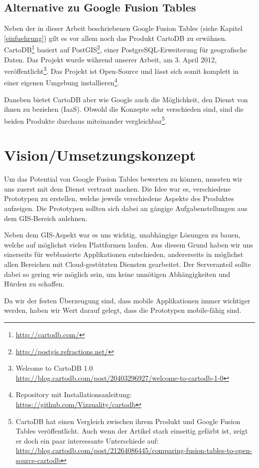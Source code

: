 \subsection{Alternative zu Google Fusion Tables}
Neben der in dieser Arbeit beschriebenen Google Fusion Tables (siehe Kapitel \ref{einfuehrung}) gilt es vor allem noch das Produkt CartoDB zu erwähnen. CartoDB\footnote{\url{http://cartodb.com/}} basiert auf PostGIS\footnote{\url{http://postgis.refractions.net/}}, einer PostgreSQL-Erweiterung für geografische Daten. Das Projekt wurde während unserer Arbeit, am 3. April 2012, veröffentlicht\footnote{Welcome to CartoDB 1.0 \url{http://blog.cartodb.com/post/20403296927/welcome-to-cartodb-1-0}}. Das Projekt ist Open-Source und lässt sich somit komplett in einer eigenen Umgebung installieren\footnote{Repository mit Installationsanleitung: \url{https://github.com/Vizzuality/cartodb}}.

Daneben bietet CartoDB aber wie Google auch die Möglichkeit, den Dienst von ihnen zu beziehen (\gls{IaaS}). Obwohl  die Konzepte sehr verschieden sind, sind die beiden Produkte durchaus miteinander vergleichbar\footnote{CartoDB hat einen Vergleich zwischen ihrem Produkt und Google Fusion Tables veröffentlicht. Auch wenn der Artikel stark einseitig gefärbt ist, zeigt er doch ein paar interessante Unterschiede auf: \url{http://blog.cartodb.com/post/21264086445/comparing-fusion-tables-to-open-source-cartodb}}.

\section{Vision/Umsetzungskonzept}
Um das Potential von Google Fusion Tables bewerten zu können, mussten wir uns zuerst mit dem Dienst vertraut machen. Die Idee war es, verschiedene Prototypen zu erstellen, welche jeweils verschiedene Aspekte des Produktes aufzeigen. Die Prototypen sollten sich dabei an gängige Aufgabenstellungen aus dem \gls{GIS}-Bereich anlehnen.

Neben dem \gls{GIS}-Aspekt war es uns wichtig, unabhängige Lösungen zu bauen, welche auf möglichst vielen Plattformen laufen. Aus diesem Grund haben wir uns einerseits für webbasierte Applikationen entschieden, andererseits in möglichst allen Bereichen mit \gls{Cloud}-gestützten Diensten gearbeitet. Der Serveranteil sollte dabei so gering wie möglich sein, um keine unnötigen Abhängigkeiten und Hürden zu schaffen.

Da wir der festen Überzeugung sind, dass mobile Applikationen immer wichtiger werden, haben wir Wert darauf gelegt, dass die Prototypen mobile-fähig sind. 

